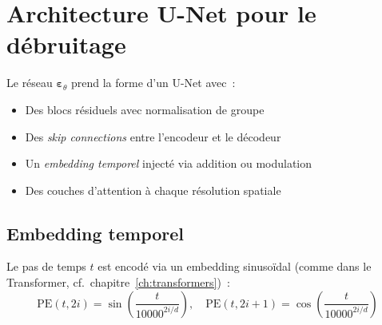 \section{Architecture U-Net pour le d\'ebruitage}
\label{sec:unet-architecture}

Le r\'eseau $\boldsymbol{\varepsilon}_\theta$ prend la forme d'un U-Net avec~:
\begin{itemize}
    \item Des blocs r\'esiduels avec normalisation de groupe
    \item Des \emph{skip connections} entre l'encodeur et le d\'ecodeur
    \item Un \emph{embedding temporel} inject\'e via addition ou modulation
    \item Des couches d'attention \`a chaque r\'esolution spatiale
\end{itemize}

\subsection{Embedding temporel}

Le pas de temps $t$ est encod\'e via un embedding sinuso\"idal (comme dans
le Transformer, cf.\ chapitre~\ref{ch:transformers})~:
\begin{equation}
\text{PE}(t, 2i) = \sin\!\left(\frac{t}{10000^{2i/d}}\right), \quad
\text{PE}(t, 2i+1) = \cos\!\left(\frac{t}{10000^{2i/d}}\right)
\end{equation}

